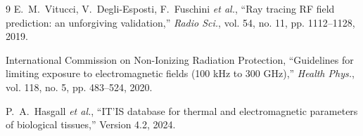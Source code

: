 \documentclass[journal]{IEEEtran}
\begin{document}
\begin{thebibliography}{9}
E.~M.~Vitucci, V.~Degli-Esposti, F.~Fuschini \emph{et al.}, ``Ray tracing RF
field prediction: an unforgiving validation,'' \emph{Radio Sci.}, vol. 54,
no. 11, pp. 1112--1128, 2019.

International Commission on Non-Ionizing Radiation Protection, ``Guidelines for
limiting exposure to electromagnetic fields (100 kHz to 300 GHz),'' \emph{Health
Phys.}, vol. 118, no. 5, pp. 483--524, 2020.

P.~A.~Hasgall \emph{et al.}, ``IT'IS database for thermal and electromagnetic
parameters of biological tissues,'' Version 4.2, 2024.

\end{thebibliography}
\end{document}
